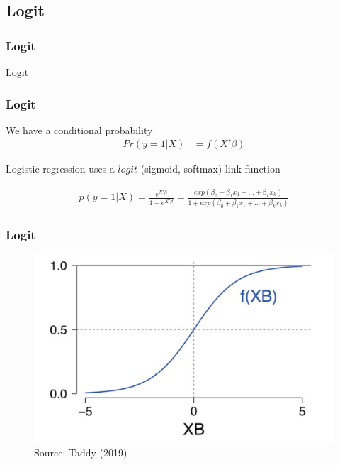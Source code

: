 \documentclass[
  shownotes,
  xcolor={svgnames},
  hyperref={colorlinks,citecolor=DarkBlue,linkcolor=DarkRed,urlcolor=DarkBlue}
  , aspectratio=169]{beamer}
\begin{document}
\subsection{Logit}
\begin{frame}[fragile]
\frametitle{Logit}


\centering
{\huge \textcolor{andesred}{Logit}}



\end{frame}
\begin{frame}[fragile]
\frametitle{Logit}
We have a conditional probability
\begin{align}
Pr(y=1|X) &= f(X'\beta) 
\end{align}

Logistic regression uses a $logit$ (sigmoid, softmax) link function

\begin{align}
p(y=1|X)=\frac{e^{X'\beta}}{1+e^{X'\beta}}=\frac{exp(\beta_0 +\beta_1 x_1 + \dots +\beta_k x_k)}{1+exp(\beta_0 +\beta_1 x_1 + \dots +\beta_k x_k)}
\end{align}

\end{frame}
\begin{frame}[fragile]
\frametitle{Logit}



        \begin{figure}[H] \centering
            \captionsetup{justification=centering}
              \includegraphics[scale=0.2]{figures/logistic}
              \\
              \tiny
              Source: Taddy (2019)
 \end{figure}

\end{frame}
\end{document}
